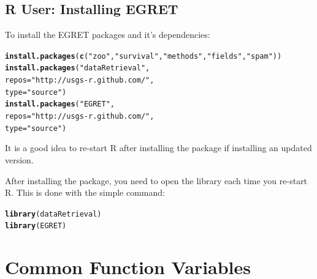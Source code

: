 \documentclass[a4paper,11pt]{article}\usepackage{graphicx, color}
\makeatletter
\newcommand{\hlfunctioncall}[1]{\textcolor[rgb]{0.501960784313725,0,0.329411764705882}{\textbf{#1}}}%
\newcommand{\hlstring}[1]{\textcolor[rgb]{0.6,0.6,1}{#1}}%
\newenvironment{kframe}{%
 \def\at@end@of@kframe{}%
 \ifinner\ifhmode%
  \def\at@end@of@kframe{\end{minipage}}%
  \begin{minipage}{\columnwidth}%
 \fi\fi%
 \def\FrameCommand##1{\hskip\@totalleftmargin \hskip-\fboxsep
 \colorbox{shadecolor}{##1}\hskip-\fboxsep
     \hskip-\linewidth \hskip-\@totalleftmargin \hskip\columnwidth}%
 \MakeFramed {\advance\hsize-\width
   \@totalleftmargin\z@ \linewidth\hsize
   \@setminipage}}%
 {\par\unskip\endMakeFramed%
 \at@end@of@kframe}
\newenvironment{knitrout}{}{} %
\makeatother
\begin{document}
\subsection{R User: Installing EGRET}
To install the EGRET packages and it's dependencies:

\begin{knitrout}
\color{fgcolor}\begin{kframe}
\begin{alltt}
\hlfunctioncall{install.packages}(\hlfunctioncall{c}(\hlstring{"zoo"},\hlstring{"survival"},\hlstring{"methods"},\hlstring{"fields"},\hlstring{"spam"}))
\hlfunctioncall{install.packages}(\hlstring{"dataRetrieval"}, 
                 repos=\hlstring{"http://usgs-r.github.com/"}, 
                 type=\hlstring{"source"})
\hlfunctioncall{install.packages}(\hlstring{"EGRET"}, 
                 repos=\hlstring{"http://usgs-r.github.com/"}, 
                 type=\hlstring{"source"})
\end{alltt}
\end{kframe}
\end{knitrout}


It is a good idea to re-start R after installing the package if installing an updated version. 

After installing the package, you need to open the library each time you re-start R.  This is done with the simple command:
\begin{knitrout}
\color{fgcolor}\begin{kframe}
\begin{alltt}
\hlfunctioncall{library}(dataRetrieval)
\hlfunctioncall{library}(EGRET)
\end{alltt}
\end{kframe}
\end{knitrout}


\newpage
\FloatBarrier
\section{Common Function Variables}
\label{sec:appendixPlot}
\end{document}
